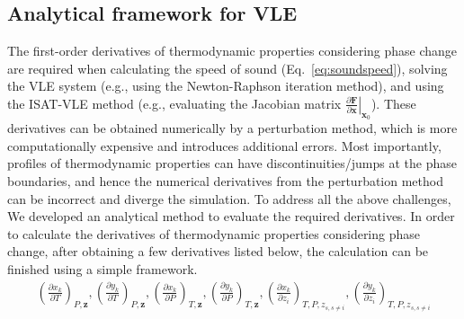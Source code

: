 \subsection{Analytical framework for VLE}
\label{sec:analytical}

The first-order derivatives of thermodynamic properties considering phase change are required when calculating the speed of sound (Eq.~\ref{eq:soundspeed}), solving the VLE system (e.g., using the Newton-Raphson iteration method), and using the ISAT-VLE method (e.g., evaluating the Jacobian matrix $\left.\frac{\partial  \mathbf{F}}{\partial \mathbf{x}}\right|_{\mathbf{x}_0}$). These derivatives can be obtained numerically by a perturbation method, which is more computationally expensive and introduces additional errors. Most importantly, profiles of thermodynamic properties can have discontinuities/jumps at the phase boundaries, and hence the numerical derivatives from the perturbation method can be incorrect and diverge the simulation. To address all the above challenges, We developed an analytical method to evaluate the required derivatives.
In order to calculate the derivatives of thermodynamic properties considering phase change, after obtaining a few derivatives listed below, the calculation can be finished using a simple framework.
\begin{align}
	\left(\frac{\partial x_k}{\partial T}\right)_{P,\mathbf{z}},\left(\frac{\partial y_k}{\partial T}\right)_{P,\mathbf{z}},\left(\frac{\partial x_k}{\partial P}\right)_{T,\mathbf{z}},\left(\frac{\partial y_k}{\partial P}\right)_{T,\mathbf{z}},\left(\frac{\partial x_k}{\partial z_i}\right)_{T,P,z_{s,s\neq i}},\left(\frac{\partial y_k}{\partial z_i}\right)_{T,P,z_{s,s\neq i}} \label{eq:base}
\end{align}

